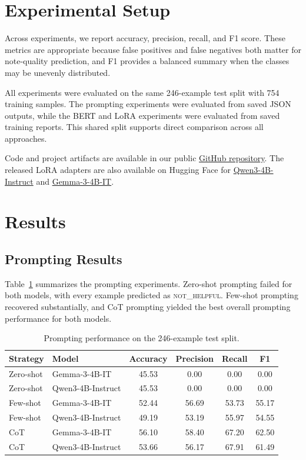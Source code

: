\documentclass[11pt]{article}
\begin{document}
	\section{Experimental Setup}
	Across experiments, we report accuracy, precision, recall, and F1 score. These metrics are appropriate because false positives and false negatives both matter for note-quality prediction, and F1 provides a balanced summary when the classes may be unevenly distributed.
	
	All experiments were evaluated on the same 246-example test split with 754 training samples. The prompting experiments were evaluated from saved JSON outputs, while the BERT and LoRA experiments were evaluated from saved training reports. This shared split supports direct comparison across all approaches.
	
	Code and project artifacts are available in our public \href{https://github.com/shahidul034/Predicting-Helpful-Community-Notes-with-Prompting-and-Parameter-Efficient-Fine-Tuning}{GitHub repository}. The released LoRA adapters are also available on Hugging Face for \href{https://huggingface.co/shahidul034/qwen3-4b-instruct-2507-CommunityNotesEffectiveness}{Qwen3-4B-Instruct} and \href{https://huggingface.co/shahidul034/gemma-3-4b-it-CommunityNotesEffectiveness}{Gemma-3-4B-IT}.
	
	\section{Results}
	\subsection{Prompting Results}
	Table~\ref{tab:prompting-results} summarizes the prompting experiments. Zero-shot prompting failed for both models, with every example predicted as \textsc{not\_helpful}. Few-shot prompting recovered substantially, and CoT prompting yielded the best overall prompting performance for both models.
	
	\begin{table}[t]
		\centering
		\small
		\begin{tabular}{llcccc}
			\toprule
			\textbf{Strategy} & \textbf{Model} & \textbf{Accuracy} & \textbf{Precision} & \textbf{Recall} & \textbf{F1} \\
			\midrule
			Zero-shot & Gemma-3-4B-IT & 45.53 & 0.00 & 0.00 & 0.00 \\
			Zero-shot & Qwen3-4B-Instruct & 45.53 & 0.00 & 0.00 & 0.00 \\
			Few-shot & Gemma-3-4B-IT & 52.44 & 56.69 & 53.73 & 55.17 \\
			Few-shot & Qwen3-4B-Instruct & 49.19 & 53.19 & 55.97 & 54.55 \\
			CoT & Gemma-3-4B-IT & 56.10 & 58.40 & 67.20 & 62.50 \\
			CoT & Qwen3-4B-Instruct & 53.66 & 56.17 & 67.91 & 61.49 \\
			\bottomrule
		\end{tabular}
		\caption{Prompting performance on the 246-example test split.}
		\label{tab:prompting-results}
	\end{table}
	
\end{document}
